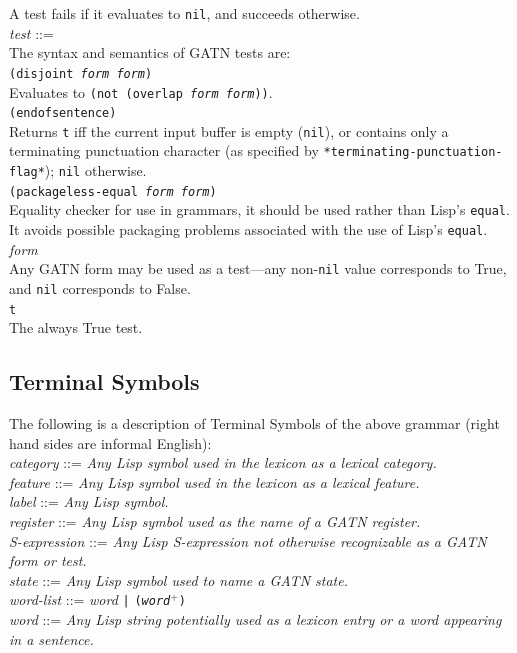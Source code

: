 \documentclass{book}
\begin{document}
A test fails if it evaluates to {\tt nil}, and succeeds otherwise. \\[2ex]
{\it test} ::= \\
The syntax and semantics of GATN tests are: \\[2ex]
{\tt (disjoint {\it form form})} \\ Evaluates to {\tt (not (overlap {\it form form}))}. \\[2ex]
{\tt (endofsentence)} \\ Returns {\tt t} iff the current input buffer is empty ({\tt nil}), or
contains only a terminating punctuation character (as specified by \verb|*terminating-punctuation-flag*|);
{\tt nil} otherwise. \\[2ex]
{\tt (packageless-equal {\it form form})} \\ Equality checker for use in grammars, it should
be used rather than Lisp's {\tt equal}.
It avoids possible packaging problems associated with the use of Lisp's {\tt equal}. \\[2ex]
{\it form} \\ Any GATN form may be used as a test---any non-{\tt nil} value corresponds to True, and
{\tt nil} corresponds to False. \\[2ex]
{\tt t} \\ The always True test.

\subsection{Terminal Symbols}

The following is a description of Terminal Symbols of the above grammar (right hand sides are
informal English): \\[2ex]
{\it category}  ::=  {\it Any Lisp symbol used in the lexicon as a lexical category.} \\[2ex]
{\it feature} ::= {\it Any Lisp symbol used in the lexicon as a lexical feature.} \\[2ex]
{\it label} ::= {\it Any Lisp symbol.} \\[2ex]
{\it register} ::= {\it Any Lisp symbol used as the name of a GATN register.} \\[2ex]
{\it S-expression} ::= {\it Any Lisp S-expression not otherwise recognizable as a GATN form or
test.} \\[2ex]
{\it state} ::= {\it Any Lisp symbol used to name a GATN state.} \\[2ex]
{\it word-list} ::= {\it word} \verb.|. {\tt ({\it word}$^+$)} \\[2ex] 
{\it word} ::= {\it Any Lisp string potentially used as a lexicon entry or a word appearing in a
sentence.}
\end{document}
